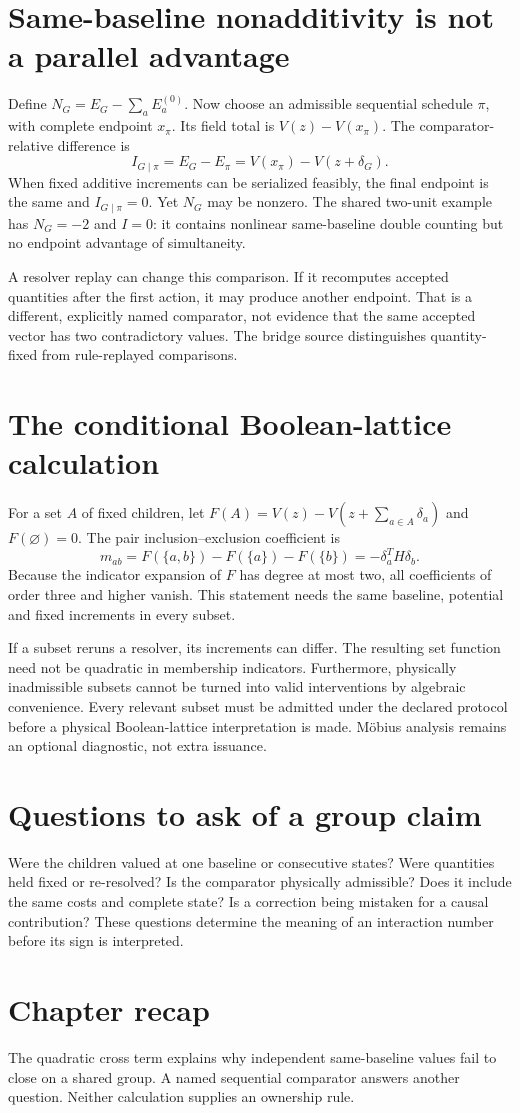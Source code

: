 \section{Same-baseline nonadditivity is not a parallel advantage}
Define $N_G=E_G-\sum_aE_a^{(0)}$. Now choose an admissible sequential
schedule $\pi$, with complete endpoint $x_\pi$. Its field total is
$V(z)-V(x_\pi)$. The comparator-relative difference is
\begin{equation}
 I_{G\mid\pi}=E_G-E_\pi=V(x_\pi)-V(z+\delta_G).
\end{equation}
When fixed additive increments can be serialized feasibly, the final
endpoint is the same and $I_{G\mid\pi}=0$. Yet $N_G$ may be nonzero.
The shared two-unit example has $N_G=-2$ and $I=0$: it contains nonlinear
same-baseline double counting but no endpoint advantage of simultaneity.

A resolver replay can change this comparison. If it recomputes accepted
quantities after the first action, it may produce another endpoint. That
is a different, explicitly named comparator, not evidence that the same
accepted vector has two contradictory values. The bridge source
\cite{bridge} distinguishes quantity-fixed from rule-replayed comparisons.

\section{The conditional Boolean-lattice calculation}
For a set $A$ of fixed children, let
$F(A)=V(z)-V(z+\sum_{a\in A}\delta_a)$ and $F(\varnothing)=0$.
The pair inclusion--exclusion coefficient is
\begin{equation}
 m_{ab}=F(\{a,b\})-F(\{a\})-F(\{b\})
       =-\delta_a^TH\delta_b.
\end{equation}
Because the indicator expansion of $F$ has degree at most two, all
coefficients of order three and higher vanish. This statement needs the
same baseline, potential and fixed increments in every subset.

If a subset reruns a resolver, its increments can differ. The resulting
set function need not be quadratic in membership indicators. Furthermore,
physically inadmissible subsets cannot be turned into valid interventions
by algebraic convenience. Every relevant subset must be admitted under the
declared protocol before a physical Boolean-lattice interpretation is made.
Möbius analysis remains an optional diagnostic, not extra issuance.

\section*{Questions to ask of a group claim}
Were the children valued at one baseline or consecutive states? Were
quantities held fixed or re-resolved? Is the comparator physically admissible?
Does it include the same costs and complete state? Is a correction being
mistaken for a causal contribution? These questions determine the meaning
of an interaction number before its sign is interpreted.

\section*{Chapter recap}
The quadratic cross term explains why independent same-baseline values fail
to close on a shared group. A named sequential comparator answers another
question. Neither calculation supplies an ownership rule.
